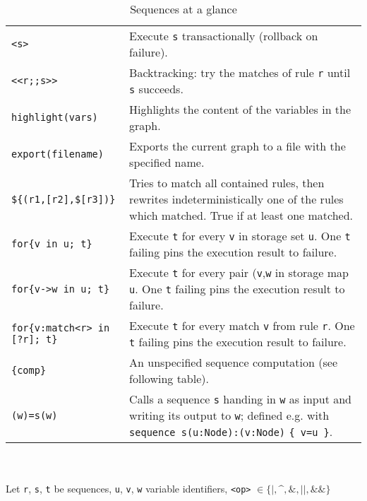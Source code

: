 \begin{table}[htbp]
\begin{minipage}{\linewidth} \renewcommand{\footnoterule}{} 
\begin{tabularx}{\linewidth}{|lX|}
\hline
\texttt{<s>}	& Execute \texttt{s} transactionally (rollback on failure).\\
\texttt{<<r;;s>>}	& Backtracking: try the matches of rule \texttt{r} until \texttt{s} succeeds.\\
\hline
\texttt{highlight(vars)} & Highlights the content of the variables in the graph. \\
\texttt{export(filename)} & Exports the current graph to a file with the specified name. \\
\hline
\texttt{\$\{(r1,[r2],\$[r3])\}}	& Tries to match all contained rules, then rewrites indeterministically one of the rules which matched. True if at least one matched.\\
\hline
\texttt{for\{v in u; t\}}	& Execute \texttt{t} for every \texttt{v} in storage set \texttt{u}. One \texttt{t} failing pins the execution result to failure.\\
\texttt{for\{v->w in u; t\}}	& Execute \texttt{t} for every pair (\texttt{v},\texttt{w} in storage map \texttt{u}. One \texttt{t} failing pins the execution result to failure.\\
\texttt{for\{v:match<r> in [?r]; t\}}	& Execute \texttt{t} for every match \texttt{v} from rule \texttt{r}. One \texttt{t} failing pins the execution result to failure.\\
\hline
\texttt{\{comp\}}	& An unspecified sequence computation (see following table).\\
\hline
\texttt{(w)=s(w)} & Calls a sequence \texttt{s} handing in \texttt{w} as input and writing its output to \texttt{w}; defined e.g. with \texttt{sequence s(u:Node):(v:Node)} \texttt{\{ v=u \}}.\\
\hline
\end{tabularx}\indexmain{\texttt{<>}}\indexmain{\texttt{<<;>>}}
\end{minipage}\\
\\ 
{\small Let \texttt{r}, \texttt{s}, \texttt{t} be sequences, \texttt{u}, \texttt{v}, \texttt{w} variable identifiers, \texttt{<op>} $\in \{\texttt{|}, \texttt{\textasciicircum}, \texttt{\&}, \texttt{||}, \texttt{\&\&}\}$ }%
\caption{Sequences at a glance}
\label{seqtab}
\end{table}
 
